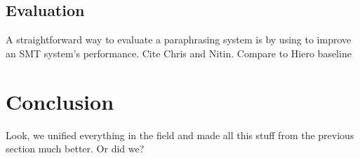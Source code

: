 \documentclass[11pt]{article}
\begin{document}
\subsection{Evaluation} \label{evaluation}

A straightforward way to evaluate a paraphrasing system is by using to
improve an SMT system's performance. Cite Chris and Nitin. Compare to
Hiero baseline



\section{Conclusion} \label{conclusion}

Look, we unified everything in the field and made all this stuff from
the previous section much better. Or did we?




\nocite{*}
\end{document}
